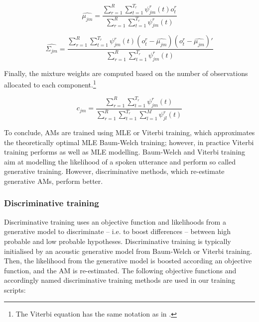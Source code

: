 \begin{equation}\label{eq:mean}
  \hat{\mu_{jm}} = \frac{\sum_{r=1}^{R}{\sum_{t=1}^{T_r}{\psi^r_{jm}(t)o^r_t}}}  {\sum_{r=1}^{R}{\sum_{t=1}^{T_r}{\psi^r_{jm}(t)}}}
\end{equation}

\begin{equation}\label{eq:var}
  \hat{\Sigma_{jm}} = \frac{\sum_{r=1}^{R}{\sum_{t=1}^{T_r}{\psi^r_{jm}(t)(o^r_t - \hat{\mu_{jm}})(o^r_t - \hat{\mu_{jm}})'}}}  {\sum_{r=1}^{R}{\sum_{t=1}^{T_r}{\psi^r_{jm}(t)}}}
\end{equation}

Finally, the mixture weights are computed based on the number of observations allocated to each component.\footnote{The Viterbi equation has the same notation as in \cite{buthpitiya2012parallel}.}

\begin{equation}\label{eq:weights}
  c_{jm} = \frac{\sum_{r=1}^{R}{\sum_{t=1}^{T_r}{\psi^r_{jm}(t)}}} {\sum_{r=1}^{R}{\sum_{t=1}^{T_r}\sum_{l=1}^{M}{\psi^r_{jl}(t)}}}
\end{equation}

To conclude, \ac{AM}s are trained using \ac{MLE} or Viterbi training, which approximates the theoretically optimal \ac{MLE} Baum-Welch training; however, in practice Viterbi training performs as well as \ac{MLE} modelling. Baum-Welch and Viterbi training aim at modelling the likelihood of a spoken utterance and perform so called generative training. However, discriminative methods, which re-estimate generative \acp{AM}, perform better.

\subsubsection*{Discriminative training}
\label{sub:subsection_name}


Discriminative training uses an objective function and likelihoods from a generative model to discriminate -- i.e. to boost differences -- between high probable and low probable hypotheses. Discriminative training is typically initialised by an acoustic generative model from Baum-Welch or Viterbi training. Then, the likelihood from the generative model is boosted according an objective function, and the \ac{AM} is re-estimated. The following objective functions and accordingly named discriminative training methods are used in our training scripts:

